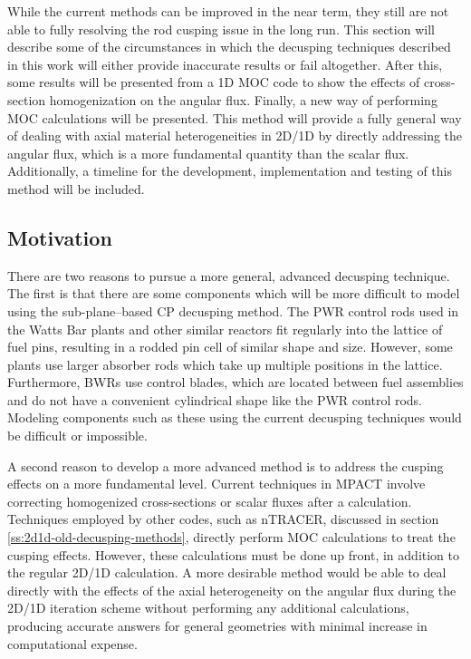 While the current methods can be improved in the near term, they still are not able to fully resolving the rod cusping issue in the long run.  This section will describe some of the circumstances in which the decusping techniques described in this work will either provide inaccurate results or fail altogether.  After this, some results will be presented from a 1D MOC code to show the effects of cross-section homogenization on the angular flux.  Finally, a new way of performing MOC calculations will be presented.  This method will provide a fully general way of dealing with axial material heterogeneities in 2D/1D by directly addressing the angular flux, which is a more fundamental quantity than the scalar flux.  Additionally, a timeline for the development, implementation and testing of this method will be included.

\subsection{Motivation}

There are two reasons to pursue a more general, advanced decusping technique.  The first is that there are some components which will be more difficult to model using the sub-plane--based CP decusping method.  The PWR control rods used in the Watts Bar plants and other similar reactors fit regularly into the lattice of fuel pins, resulting in a rodded pin cell of similar shape and size.  However, some plants use larger absorber rods which take up multiple positions in the lattice.  Furthermore, BWRs use control blades, which are located between fuel assemblies and do not have a convenient cylindrical shape like the PWR control rods.  Modeling components such as these using the current decusping techniques would be difficult or impossible.

A second reason to develop a more advanced method is to address the cusping effects on a more fundamental level.  Current techniques in MPACT involve correcting homogenized cross-sections or scalar fluxes after a calculation.  Techniques employed by other codes, such as nTRACER, discussed in section \ref{ss:2d1d-old-decusping-methods}, directly perform MOC calculations to treat the cusping effects.  However, these calculations must be done up front, in addition to the regular 2D/1D calculation.  A more desirable method would be able to deal directly with the effects of the axial heterogeneity on the angular flux during the 2D/1D iteration scheme without performing any additional calculations, producing accurate answers for general geometries with minimal increase in computational expense.

